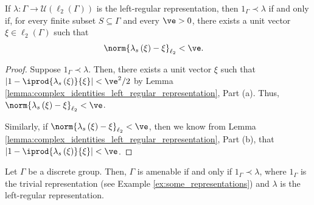 \begin{lemma}\label{lemma:l2_unit_vector}
  If $\lambda\colon\Gamma\rightarrow \mathcal{U}\left( \ell_2\left( \Gamma \right) \right)$ is the left-regular representation, then $1_{\Gamma}\prec \lambda$ if and only if, for every finite subset $S\subseteq \Gamma$ and every $\ve > 0$, there exists a unit vector $\xi\in \ell_2\left( \Gamma \right)$ such that
  \begin{align*}
    \norm{\lambda_s\left( \xi \right) - \xi}_{\ell_2} &< \ve.
  \end{align*}
\end{lemma}
\begin{proof}
  Suppose $1_{\Gamma}\prec \lambda$. Then, there exists a unit vector $\xi$ such that $\left\vert 1 - \iprod{\lambda_s\left( \xi \right)}{\xi} \right\vert < \ve^2/2$ by Lemma \ref{lemma:complex_identities_left_regular_representation}, Part (a). Thus, $\norm{\lambda_s\left( \xi \right) - \xi}_{\ell_2} < \ve$.\newline

  Similarly, if $\norm{\lambda_s\left( \xi \right) - \xi}_{\ell_2} < \ve$, then we know from Lemma \ref{lemma:complex_identities_left_regular_representation}, Part (b), that $ \left\vert 1 - \iprod{\lambda_s\left( \xi \right)}{\xi} \right\vert < \ve $.
\end{proof}
\begin{theorem}
  Let $\Gamma$ be a discrete group. Then, $\Gamma$ is amenable if and only if $1_{\Gamma}\prec \lambda$, where $1_{\Gamma}$ is the trivial representation (see Example \ref{ex:some_representations}) and $\lambda$ is the left-regular representation.
\end{theorem}
